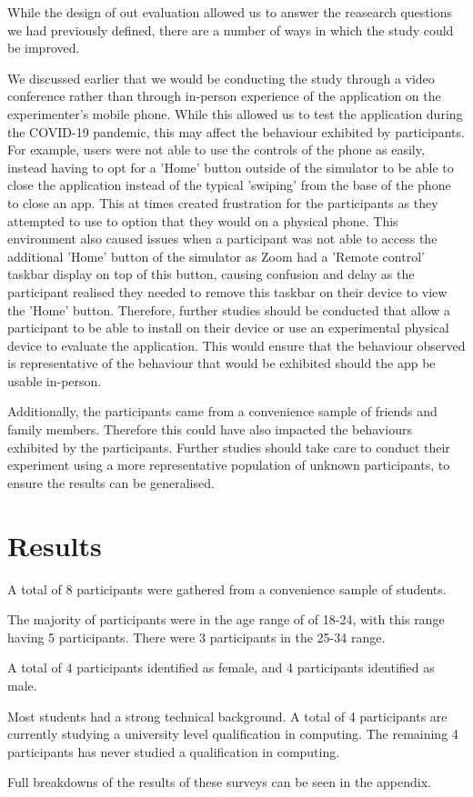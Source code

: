 \documentclass{l4proj}
\begin{document}
While the design of out evaluation allowed us to answer the reasearch questions we had previously defined, there are a number
of ways in which the study could be improved.
\par 
We discussed earlier that we would be conducting the study through a video conference rather than through in-person experience
of the application on the experimenter's mobile phone. While this allowed us to test the application during the COVID-19
pandemic, this may affect the behaviour exhibited by participants. For example, users were not able to use the controls of the 
phone as easily, instead having to opt for a 'Home' button outside of the simulator to be able to close the application instead
of the typical 'swiping' from the base of the phone to close an app. This at times created frustration for the participants as 
they attempted to use to option that they would on a physical phone. This environment also caused issues when a participant was
not able to access the additional 'Home' button of the simulator as Zoom had a 'Remote control' taskbar display on top of this 
button, causing confusion and delay as the participant realised they needed to remove this taskbar on their device to view the
'Home' button. Therefore, further studies should be conducted that allow a participant to be able to install on their device 
or use an experimental physical device to evaluate the application. This would ensure that the behaviour observed is representative 
of the behaviour that would be exhibited should the app be usable in-person.
\par 
Additionally, the participants came from a convenience sample of friends and family members. Therefore this could have also impacted
the behaviours exhibited by the participants. Further studies should take care to conduct their experiment using a more representative 
population of unknown participants, to ensure the results can be generalised.

\section{Results}

A total of 8 participants were gathered from a convenience sample of students.
\par 
The majority of participants were in the age range of of 18-24, with this range having 5 participants. There were 
3 participants in the 25-34 range.
\par 
A total of 4 participants identified as female, and 4 participants identified as male.
\par 
Most students had a strong technical background. A total of 4 participants are currently studying a university level 
qualification in computing. The remaining 4 participants has never studied a qualification in computing.
\par 
Full breakdowns of the results of these surveys can be seen in the appendix.
\end{document}
